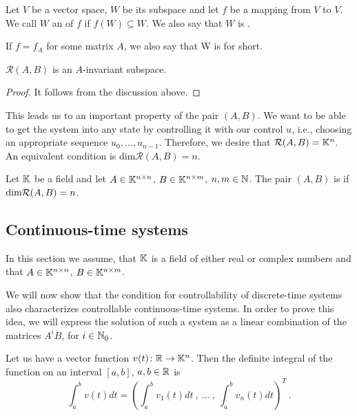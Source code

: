 \begin{definition}
	Let $V$ be a vector space, $W$ be its subspace and let $f$ be a mapping from $V$ to $V$. We call $W$ an  of $f$ if $f(W)\subseteq W$. We also say that $W$ is . 
	
	If $f=f_A$ for some matrix $A$, we also say that W is  for short.
\end{definition}

\begin{lemma}
	\label{lem:reachinv}
	$\mathcal{R}(A,B)$ is an $A$-invariant subspace.
\end{lemma} 

\begin{proof}
	It follows from the discussion above.
\end{proof}

This leads us to an important property of the pair $(A,B)$. We want to be able to get the system into any state by controlling it with our control $u$, i.e., choosing an appropriate sequence $u_0,\ldots,u_{n-1}$. Therefore, we desire that $\mathcal{R}(A,B)=\mathbb{K}^n$. An equivalent condition is $\text{dim}\mathcal{R}(A,B)=n$.

\begin{definition}
	Let $\mathbb{K}$ be a field and let $A \in \mathbb{K}^{n \times n}$, $B \in \mathbb{K}^{n \times m}$, $n,m \in \mathbb{N}$. The pair $(A,B)$ is  if $\textnormal{dim}\mathcal{R}(A,B)=n$.
\end{definition}

\subsection{Continuous-time systems}

\begin{remark}
	In this section we assume, that $\mathbb{K}$ is a field of either real or complex numbers and that $A\in\mathbb{K}^{n\times n}$, $B\in\mathbb{K}^{n\times m}$.
\end{remark}

We will now show that the condition for controllability of discrete-time systems also characterizes controllable continuous-time systems. In order to prove this idea, we will express the solution of such a system as a linear combination of the matrices $A^iB$, for $i\in \mathbb{N}_0$.

\begin{definition}
	Let us have a vector function $v(t)\colon\mathbb{R}\to\mathbb{K}^n$. Then the definite integral of the function on an interval $[a,b]$, $a,b\in\mathbb{R}$ is
	$$\int_a^bv(t)dt=\left(\int_a^bv_1(t)dt\ ,\ \ldots\ ,\ \int_a^bv_n(t)dt\right)^T\ .$$
\end{definition}

